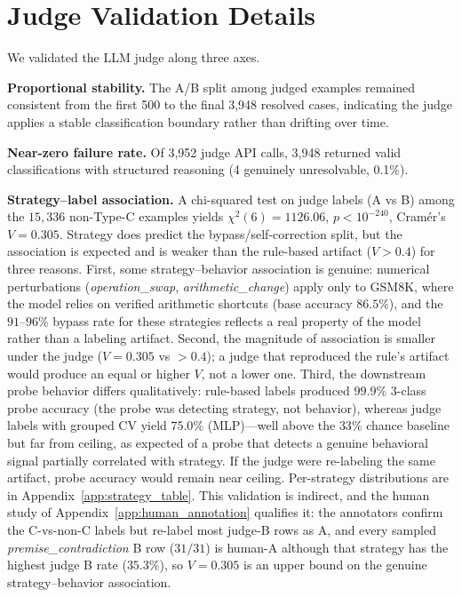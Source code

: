 \documentclass[10pt]{article} %
\begin{document}
\section{Judge Validation Details}
\label{app:judge_validation}

We validated the LLM judge along three axes.

\textbf{Proportional stability.} The A/B split among judged examples remained consistent from the first 500 to the final 3,948 resolved cases, indicating the judge applies a stable classification boundary rather than drifting over time.

\textbf{Near-zero failure rate.} Of 3,952 judge API calls, 3,948 returned valid classifications with structured reasoning (4 genuinely unresolvable, 0.1\%).

\textbf{Strategy--label association.} A chi-squared test on judge labels (A vs B) among the $15{,}336$ non-Type-C examples yields $\chi^2(6) = 1126.06$, $p < 10^{-240}$, Cram\'{e}r's $V = 0.305$. Strategy does predict the bypass/self-correction split, but the association is expected and is weaker than the rule-based artifact ($V > 0.4$) for three reasons. First, some strategy--behavior association is genuine: numerical perturbations (\emph{operation\_swap}, \emph{arithmetic\_change}) apply only to GSM8K, where the model relies on verified arithmetic shortcuts (base accuracy $86.5\%$), and the $91$--$96\%$ bypass rate for these strategies reflects a real property of the model rather than a labeling artifact. Second, the magnitude of association is smaller under the judge ($V = 0.305$ vs $> 0.4$); a judge that reproduced the rule's artifact would produce an equal or higher $V$, not a lower one. Third, the downstream probe behavior differs qualitatively: rule-based labels produced $99.9\%$ 3-class probe accuracy (the probe was detecting strategy, not behavior), whereas judge labels with grouped CV yield $75.0\%$ (MLP)---well above the $33\%$ chance baseline but far from ceiling, as expected of a probe that detects a genuine behavioral signal partially correlated with strategy. If the judge were re-labeling the same artifact, probe accuracy would remain near ceiling. Per-strategy distributions are in Appendix~\ref{app:strategy_table}. This validation is indirect, and the human study of Appendix~\ref{app:human_annotation} qualifies it: the annotators confirm the C-vs-non-C labels but re-label most judge-B rows as A, and every sampled \emph{premise\_contradiction} B row ($31/31$) is human-A although that strategy has the highest judge B rate ($35.3\%$), so $V = 0.305$ is an upper bound on the genuine strategy--behavior association.
\end{document}
